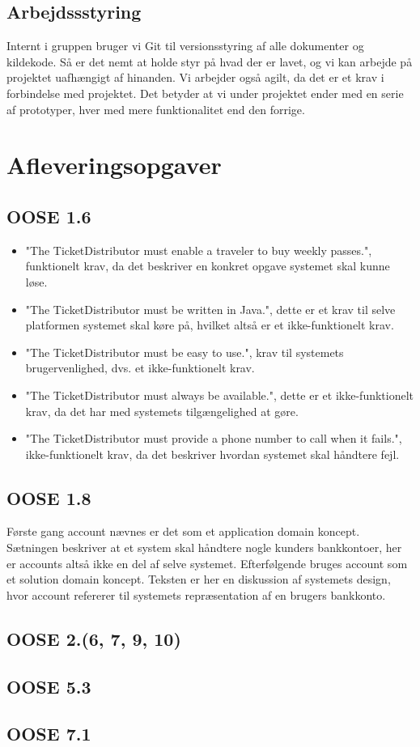 \documentclass[12pt]{article}
\begin{document}
\subsection{Arbejdssstyring}
Internt i gruppen bruger vi Git til versionsstyring af alle dokumenter og kildekode. Så er det nemt at holde styr på hvad der er lavet, og vi kan arbejde på projektet uafhængigt af hinanden. Vi arbejder også agilt, da det er et krav i forbindelse med projektet. Det betyder at vi under projektet ender med en serie af prototyper, hver med mere funktionalitet end den forrige.

\section{Afleveringsopgaver}
\subsection{OOSE 1.6}
\begin{itemize}
\item "The TicketDistributor must enable a traveler to buy weekly passes.",	funktionelt krav, da det beskriver en konkret opgave systemet skal kunne løse.
\item "The TicketDistributor must be written in Java.", dette er et krav til selve platformen systemet skal køre på, hvilket altså er et ikke-funktionelt krav.
\item "The TicketDistributor must be easy to use.", krav til systemets brugervenlighed, dvs. et ikke-funktionelt krav.
\item "The TicketDistributor must always be available.", dette er et ikke-funktionelt krav, da det har med systemets tilgængelighed at gøre.
\item "The TicketDistributor must provide a phone number to call when it fails.", ikke-funktionelt krav, da det beskriver hvordan systemet skal håndtere fejl.
\end{itemize}
\subsection{OOSE 1.8}
Første gang account nævnes er det som et application domain koncept. Sætningen beskriver at et system skal håndtere nogle kunders bankkontoer, her er accounts altså ikke en del af selve systemet. Efterfølgende bruges account som et solution domain koncept. Teksten er her en diskussion af systemets design, hvor account refererer til systemets repræsentation af en brugers bankkonto.
\subsection{OOSE 2.(6, 7, 9, 10)}
\subsection{OOSE 5.3}
\subsection{OOSE 7.1}

{}
\end{document}
